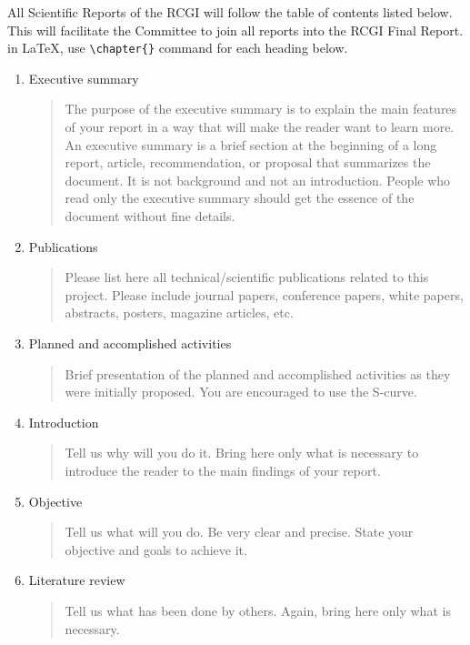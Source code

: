 All Scientific Reports of the RCGI will follow the table of contents listed below. This will facilitate the Committee to join all reports into the RCGI Final Report. in \LaTeX, use \verb+\chapter{}+ command for each heading below.
\begin{enumerate}
    \item Executive summary
    \begin{quote}
    The purpose of the executive summary is to explain the main features of your report in a way that will make the reader want to learn more. An executive summary is a brief section at the beginning of a long report, article, recommendation, or proposal that summarizes the document. It is not background and not an introduction. People who read only the executive summary should get the essence of the document without fine details.
    \end{quote}
    \item Publications
    \begin{quote}
    Please list here all technical/scientific publications related to this project. Please include journal papers, conference papers, white papers, abstracts, posters, magazine articles, etc.
    \end{quote}
    \item Planned and accomplished activities
    \begin{quote}
    Brief presentation of the planned and accomplished activities as they were initially proposed. You are encouraged to use the S-curve.
    \end{quote}
    \item Introduction
    \begin{quote}
    Tell us why will you do it. Bring here only what is necessary to introduce the reader to the main findings of your report. 
    \end{quote}
    \item Objective
    \begin{quote}
    Tell us what will you do. Be very clear and precise. State your objective and goals to achieve it. 
    \end{quote}
    \item Literature review
    \begin{quote}
    Tell us what has been done by others. Again, bring here only what is necessary. 
    \end{quote}

\end{enumerate}
